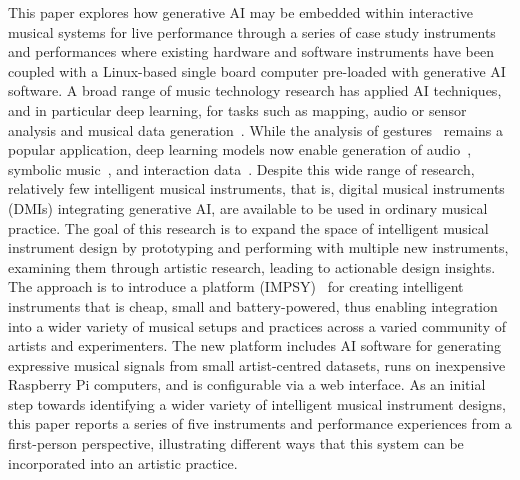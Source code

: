 \documentclass[sigconf]{nimeart}
\begin{document}
This paper explores how generative AI may be embedded within interactive musical systems for live performance through a series of case study instruments and performances where existing hardware and software instruments have been coupled with a Linux-based single board computer pre-loaded with generative AI software.
A broad range of music technology research has applied AI techniques, and in particular deep learning, for tasks such as mapping, audio or sensor analysis and musical data generation~\cite{jourdan_nime_ml_review}. 
While the analysis of gestures~\cite{visi_iml_gesture} remains a popular application, deep learning models now enable generation of audio~\cite{caillon_rave}, symbolic music~\cite{ji_survey_2024}, and interaction data~\cite{Martin2019}.
Despite this wide range of research, relatively few intelligent musical instruments, that is, digital musical instruments (DMIs) integrating generative AI, are available to be used in ordinary musical practice.
The goal of this research is to expand the space of intelligent musical instrument design by prototyping and performing with multiple new instruments, examining them through artistic research, leading to actionable design insights.
The approach is to introduce a platform (IMPSY)~\cite{impsy_software_zenodo} for creating intelligent instruments that is cheap, small and battery-powered, thus enabling integration into a wider variety of musical setups and practices across a varied community of artists and experimenters. 
The new platform includes AI software for generating expressive musical signals from small artist-centred datasets, runs on inexpensive Raspberry Pi computers, and is configurable via a web interface.
As an initial step towards identifying a wider variety of intelligent musical instrument designs, this paper reports a series of five instruments and performance experiences from a first-person perspective, illustrating different ways that this system can be incorporated into an artistic practice.
\end{document}
